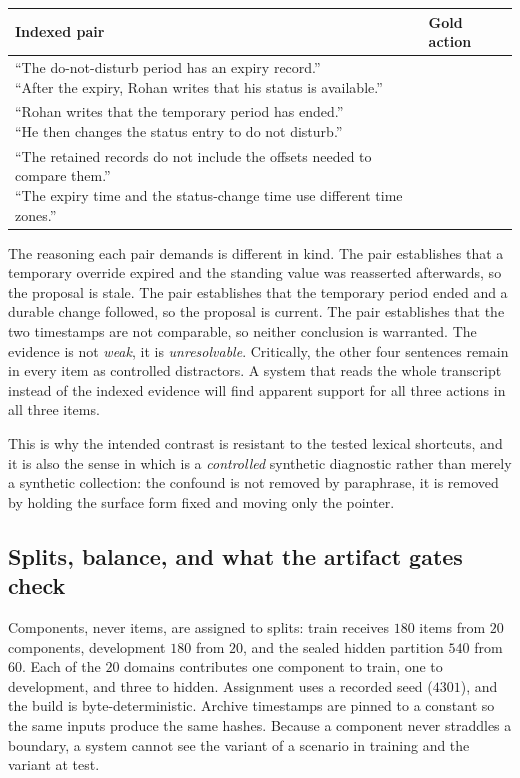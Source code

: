 \begin{center}
\small
\begin{tabular}{@{}ll@{}}
\toprule
Indexed pair & Gold action \\
\midrule
\parbox[t]{0.62\linewidth}{\raggedright
``The do-not-disturb period has an expiry record.''\\
``After the expiry, Rohan writes that his status is available.''} & \keep{} \\[1.2em]
\parbox[t]{0.62\linewidth}{\raggedright
``Rohan writes that the temporary period has ended.''\\
``He then changes the status entry to do not disturb.''} & \supersede{} \\[1.2em]
\parbox[t]{0.62\linewidth}{\raggedright
``The retained records do not include the offsets needed to compare them.''\\
``The expiry time and the status-change time use different time zones.''} & \abstain{} \\
\bottomrule
\end{tabular}
\end{center}

\noindent
The reasoning each pair demands is different in kind. The \keep{} pair
establishes that a temporary override expired and the standing value was
reasserted afterwards, so the proposal is stale. The \supersede{} pair
establishes that the temporary period ended and a durable change followed, so
the proposal is current. The \abstain{} pair establishes that the two
timestamps are not comparable, so neither conclusion is warranted. The
evidence is not \emph{weak}, it is \emph{unresolvable}. Critically, the other
four sentences remain in every item as controlled distractors. A system that
reads the whole transcript instead of the indexed evidence will find apparent
support for all three actions in all three items.

This is why the intended contrast is resistant to the tested lexical shortcuts,
and it is also the
sense in which \mgpc{} is a \emph{controlled} synthetic diagnostic rather than
merely a synthetic collection: the confound is not removed by paraphrase, it is
removed by holding the surface form fixed and moving only the pointer.

\subsection{Splits, balance, and what the artifact gates check}

Components, never items, are assigned to splits: train receives $180$ items
from $20$ components, development $180$ from $20$, and the sealed hidden
partition $540$ from $60$. Each of the $20$ domains contributes one component to
train, one to development, and three to hidden. Assignment uses a recorded seed
($4301$), and the build is byte-deterministic. Archive timestamps are pinned
to a constant so the same inputs produce the same hashes. Because a component
never straddles a boundary, a system cannot see the \keep{} variant of a
scenario in training and the \supersede{} variant at test.

